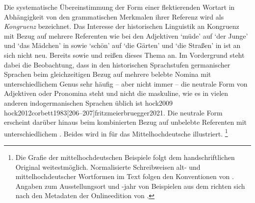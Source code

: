 Die systematische Übereinstimmung der Form einer flektierenden Wortart in
Abhängigkeit von den grammatischen Merkmalen ihrer
Referenz wird als \emph{Kongruenz} bezeichnet. Das Interesse der historischen
Linguistik an Kongruenz mit Bezug auf mehrere Referenten
wie bei den Adjektiven  `müde' auf
 `der Junge' und  `das Mädchen' in
 sowie  `schön' auf  `die
Gärten' und  `die Straßen' in  ist an sich
nicht neu. Bereits
\textcites[978]{grimm1848}[307--314]{grimm1890}[313--336]{grimm1898} sowie
\citet[244--247]{delbrueck1900} und \citet[33--41]{behaghel1928} reißen dieses
Thema an. Im Vordergrund steht dabei die Beobachtung, dass in den
historischen Sprachstufen germanischer Sprachen
beim gleichzeitigen Bezug auf mehrere belebte Nomina mit
unterschiedlichem Genus sehr häufig -- aber nicht immer -- die neutrale Form
von Adjektiven oder Pronomina steht und nicht die maskuline, wie
es in vielen anderen indogermanischen Sprachen üblich ist
\autocites[vgl.~z.\,B.][]%
	{hock2008}%
	{hock2009}%
	{hock2012}{corbett1983}[206--207]{fritzmeierbruegger2021}. Die neutrale
Form erscheint darüber hinaus beim kombinierten Bezug auf
unbelebte Referenten mit unterschiedlichem . Beides
wird in  für das Mittelhochdeutsche
illustriert.%
%
	\footnote{Die Grafie der mittelhochdeutschen
		Beispiele folgt dem handschriftlichen Original weitest\-möglich.
		Normalisierte Schreibweisen alt-
		und mittelhochdeutscher Wortformen im Text folgen
		den Konventionen von \textcites[579--581]{ksw3}[989--991]{ksw2}.
		Angaben zum Ausstellungsort und -jahr von Beispielen aus dem \CAO{}
		richten sich nach den Metadaten der Online\-edition von
		\citet{cao-online}.%
	}

